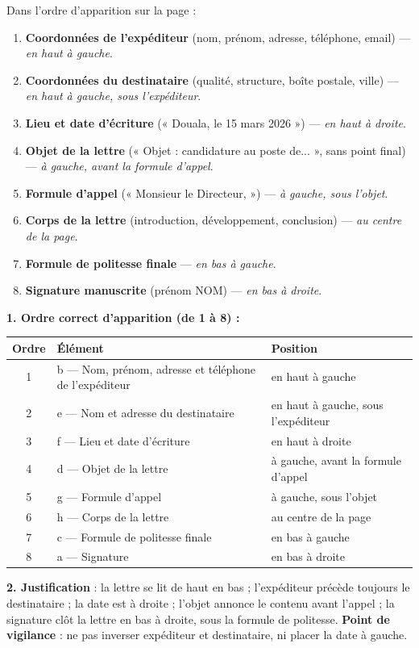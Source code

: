 \documentclass[11pt]{article}
\begin{document}
\begin{corrige}
Dans l'ordre d'apparition sur la page :
\begin{enumerate}
\item \textbf{Coordonnées de l'expéditeur} (nom, prénom, adresse, téléphone, email) — \emph{en haut à gauche}.
\item \textbf{Coordonnées du destinataire} (qualité, structure, boîte postale, ville) — \emph{en haut à gauche, sous l'expéditeur}.
\item \textbf{Lieu et date d'écriture} (« Douala, le 15 mars 2026 ») — \emph{en haut à droite}.
\item \textbf{Objet de la lettre} (« Objet : candidature au poste de... », sans point final) — \emph{à gauche, avant la formule d'appel}.
\item \textbf{Formule d'appel} (« Monsieur le Directeur, ») — \emph{à gauche, sous l'objet}.
\item \textbf{Corps de la lettre} (introduction, développement, conclusion) — \emph{au centre de la page}.
\item \textbf{Formule de politesse finale} — \emph{en bas à gauche}.
\item \textbf{Signature manuscrite} (prénom NOM) — \emph{en bas à droite}.
\end{enumerate}
\end{corrige}

\begin{corrige}
\textbf{1. Ordre correct d'apparition (de 1 à 8) :}
\begin{center}
\begin{tabularx}{\linewidth}{|c|X|l|}\hline
\textbf{Ordre} & \textbf{Élément} & \textbf{Position} \\ \hline
1 & b — Nom, prénom, adresse et téléphone de l'expéditeur & en haut à gauche \\ \hline
2 & e — Nom et adresse du destinataire & en haut à gauche, sous l'expéditeur \\ \hline
3 & f — Lieu et date d'écriture & en haut à droite \\ \hline
4 & d — Objet de la lettre & à gauche, avant la formule d'appel \\ \hline
5 & g — Formule d'appel & à gauche, sous l'objet \\ \hline
6 & h — Corps de la lettre & au centre de la page \\ \hline
7 & c — Formule de politesse finale & en bas à gauche \\ \hline
8 & a — Signature & en bas à droite \\ \hline
\end{tabularx}
\end{center}
\textbf{2. Justification} : la lettre se lit de haut en bas ; l'expéditeur précède toujours le destinataire ; la date est à droite ; l'objet annonce le contenu avant l'appel ; la signature clôt la lettre en bas à droite, sous la formule de politesse.
\textbf{Point de vigilance} : ne pas inverser expéditeur et destinataire, ni placer la date à gauche.
\end{corrige}
\end{document}
